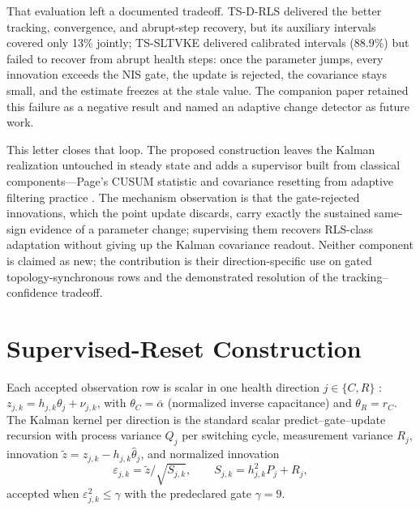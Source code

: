 \documentclass[journal]{IEEEtran}
\newcommand{\TSRLS}{TS-D-RLS}
\newcommand{\TSKF}{TS-SLTVKE}
\begin{document}
That evaluation left a documented tradeoff. \TSRLS{} delivered the better
tracking, convergence, and abrupt-step recovery, but its auxiliary
intervals covered only 13\% jointly; \TSKF{} delivered calibrated
intervals (88.9\%) but failed to recover from abrupt health steps: once
the parameter jumps, every innovation exceeds the NIS gate, the update is
rejected, the covariance stays small, and the estimate freezes at the
stale value. The companion paper retained this failure as a negative
result and named an adaptive change detector as future work.

This letter closes that loop. The proposed construction leaves the Kalman
realization untouched in steady state and adds a supervisor built from
classical components---Page's CUSUM statistic \cite{page1954cusum} and
covariance resetting from adaptive filtering practice
\cite{mehra1970adaptive,willsky1976survey,gustafsson2000adaptive,barshalom2001estimation}.
The mechanism observation is that the gate-rejected innovations, which the
point update discards, carry exactly the sustained same-sign evidence of a
parameter change; supervising them recovers RLS-class adaptation without
giving up the Kalman covariance readout. Neither component is claimed as
new; the contribution is their direction-specific use on gated
topology-synchronous rows and the demonstrated resolution of the
tracking--confidence tradeoff.

\section{Supervised-Reset Construction}
Each accepted observation row is scalar in one health direction
$j\in\{C,R\}$ \cite{companion2026}: $z_{j,k}=h_{j,k}\theta_j+\nu_{j,k}$,
with $\theta_C=\bar\alpha$ (normalized inverse capacitance) and
$\theta_R=r_C$. The Kalman kernel per direction is the standard scalar
predict--gate--update recursion with process variance $Q_j$ per switching
cycle, measurement variance $R_j$, innovation
$\tilde z=z_{j,k}-h_{j,k}\hat\theta_j$, and normalized innovation
\begin{equation}
\varepsilon_{j,k}=\tilde z/\sqrt{S_{j,k}},\qquad
S_{j,k}=h_{j,k}^2P_j+R_j,
\label{eq:nis}
\end{equation}
accepted when $\varepsilon_{j,k}^2\le\gamma$ with the predeclared gate
$\gamma=9$.
\end{document}
